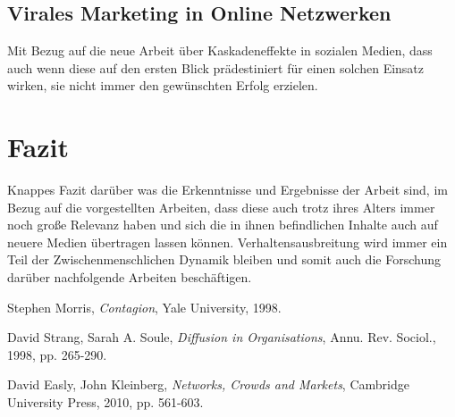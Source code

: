 \documentclass[12pt]{article}
\begin{document}
\subsection{Virales Marketing in Online Netzwerken}
Mit Bezug auf die neue Arbeit über Kaskadeneffekte in sozialen Medien, dass auch wenn diese auf den ersten Blick prädestiniert für einen solchen Einsatz wirken, sie nicht immer den gewünschten Erfolg erzielen. 

\section{Fazit}
Knappes Fazit darüber was die Erkenntnisse und Ergebnisse der Arbeit sind, im Bezug auf die vorgestellten Arbeiten, dass diese auch trotz ihres Alters immer noch große Relevanz haben und sich die in ihnen befindlichen Inhalte auch auf neuere Medien übertragen lassen können. Verhaltensausbreitung wird immer ein Teil der Zwischenmenschlichen Dynamik bleiben und somit auch die Forschung darüber nachfolgende Arbeiten beschäftigen.


\begin{thebibliography}{9}

  Stephen Morris,
  \emph{Contagion},
  Yale University,
  1998.
 
	David Strang, Sarah A. Soule,
	\emph{Diffusion in Organisations},
	Annu. Rev. Sociol., 1998, pp. 265-290.
	
	David Easly, John Kleinberg, 
	\emph{Networks, Crowds and Markets},
	Cambridge University Press, 2010, pp. 561-603.
\end{thebibliography}
\end{document}
